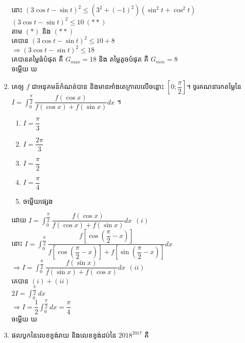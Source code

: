 \documentclass[12pt, a4paper]{article}
\begin{document}
\begin{enumerate}[m]
\begin{center}
\begin{center}
			នោះ $\left(3\cos t-\sin t\right)^2\le\left(3^2+\left(-1\right)^2\right)\left(\sin^2t+\cos^2t\right)$\\
			$\left(3\cos t-\sin t\right)^2\le10~(**)$\\
			តាម $(*)$ និង $(**)$\\
			គេបាន $\left(3\cos t-\sin t\right)^2\le10+8$\\
			$\Rightarrow \left(3\cos t-\sin t\right)^2\le18$\\
			គេបានតម្លៃធំបំផុត គឺ $G_{max}=18$ និង តម្លៃតូចបំផុត គឺ $G_{min}=8$\\
			\kml ចម្លើយ \kbk ឃ
		\end{center}
	\end{center}
	{\color{blue}\hrulefill}
	\item គេឲ្យ $f$ ជាអនុគមន៍កំណត់បាន និងមានអាំងតេក្រាលលើចន្លោះ $\left[0;\dfrac{\pi}{2}\right]$។ ចូរគណនារកតម្លៃនៃ $I=\int_{0}^{\dfrac{\pi}{2}}\dfrac{f\left(\cos x\right)}{f\left(\cos x\right)+f\left(\sin x\right)}dx$ ។\\
	\begin{enumerate}[k,5]
		\item $I=\dfrac{\pi}{3}$
		\item $I=\dfrac{2\pi}{3}$
		\item $I=\dfrac{\pi}{2}$
		\item $I=\dfrac{\pi}{4}$
		\item ចម្លើយផ្សេង
	\end{enumerate}
	\answer
	\begin{center}
		ដោយ $I=\int_{0}^{\dfrac{\pi}{2}}\dfrac{f\left(\cos x\right)}{f\left(\cos x\right)+f\left(\sin x\right)}dx~~(i)$\\
		នោះ $I=\int_{0}^{\dfrac{\pi}{2}}\dfrac{f\left[\cos \left(\dfrac{\pi}{2}-x\right)\right]}{f\left[\cos \left(\dfrac{\pi}{2}-x\right)\right]+f\left[\sin \left(\dfrac{\pi}{2}-x\right)\right]}dx$\\
		$\Rightarrow I=\int_{0}^{\dfrac{\pi}{2}}\dfrac{f\left(\sin x\right)}{f\left(\sin x\right)+f\left(\cos x\right)}dx~~(ii)$\\
		គេបាន $(i)+(ii)$\\
		$2I=\int_{0}^{\dfrac{\pi}{2}}dx$\\
		$\Rightarrow I=\dfrac{1}{2}\int_{0}^{\dfrac{\pi}{2}}dx=\dfrac{\pi}{4}$\\
		\kml ចម្លើយ \kbk ឃ
	\end{center}
	\item ផលបូកនៃលេខខ្ទង់រាយ និងលេខខ្ទង់ដប់នៃ $2018^{2017}$ គឺ
	\begin{enumerate}[k,5]

\end{enumerate}
\end{enumerate}
\end{document}
